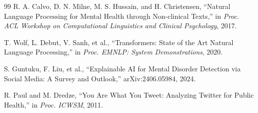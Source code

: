 \documentclass[11pt]{article}
\begin{document}
\begin{thebibliography}{99}
R. A. Calvo, D. N. Milne, M. S. Hussain, and H. Christensen, ``Natural Language Processing for Mental Health through Non-clinical Texts,'' in \textit{Proc. ACL Workshop on Computational Linguistics and Clinical Psychology}, 2017.

T. Wolf, L. Debut, V. Sanh, et al., ``Transformers: State of the Art Natural Language Processing,'' in \textit{Proc. EMNLP: System Demonstrations}, 2020.

S. Guntuku, F. Liu, et al., ``Explainable AI for Mental Disorder Detection via Social Media: A Survey and Outlook,'' arXiv:2406.05984, 2024.

R. Paul and M. Dredze, ``You Are What You Tweet: Analyzing Twitter for Public Health,'' in \textit{Proc. ICWSM}, 2011.

\end{thebibliography}
\end{document}
